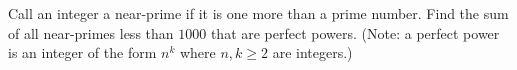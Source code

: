 Call an integer a near-prime if it is one more than a prime number. Find the sum of all near-primes less than $1000$ that are perfect powers. (Note: a perfect power is an integer of the form $n^k$ where $n, k \ge 2$ are integers.)
